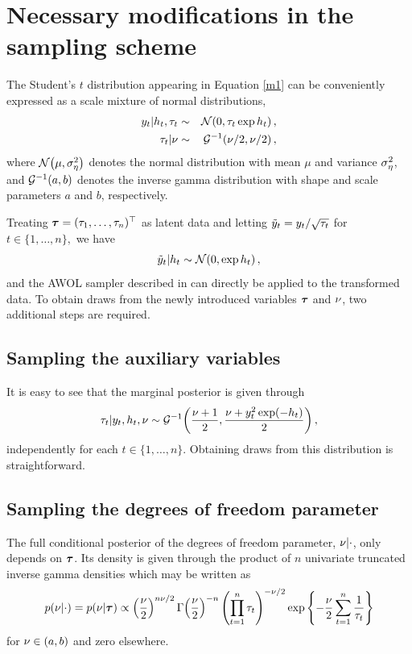 \documentclass[article, nojss]{jss}
\begin{document}
\section{Necessary modifications in the sampling scheme}
\label{sec:alg}

The Student's $t$ distribution appearing in Equation \ref{m1} can be conveniently expressed as a scale mixture of normal distributions,
\begin{eqnarray*}
y_{t}|\hsv_t,\taug_t &\sim&  \Normal{0, \taug_t \exp{\hsv_{t}}},%
 \\
 \taug_t|\df &\sim& \Gammainv{\df/2, \df/2},
\end{eqnarray*}
where $\mathcal{N}\!\left(\mu, {\sigma_\eta^2}\right)$ denotes the normal distribution with mean $\mu$ and variance ${\sigma_\eta^2}$, and $\mathcal{G}^{-1}\!\left(a,b\right)$ denotes the inverse gamma distribution with shape and scale parameters $a$ and $b$, respectively.

Treating $\bm{\tau} = (\tau_1, \dots, \tau_n)^\top$ as latent data and letting $\tilde y_t = y_t/\sqrt{\tau_t}$ for $t \in \{1,\dots,n\},$ we have
\[
\tilde y_t|h_t \sim \mathcal{N}\!\left(0, \exp{h_t}\right),
\]
and the AWOL sampler described in \cite{kas-fru:anc} can directly be applied to the transformed data. To obtain draws from the newly introduced variables $\bm{\tau}$ and $\nu$, two additional steps are required.

\subsection{Sampling the auxiliary variables}

It is easy to see that the marginal posterior is given through
\[
\tau_t|y_t,h_t,\nu \sim \mathcal{G}^{-1}\!\left(\frac{\nu + 1}{2},\frac{\nu + y_t^2\exp(-h_t)}{2}\right),
\]
independently for each $t \in \{1, \dots, n\}$. Obtaining draws from this distribution is straightforward.

\subsection{Sampling the degrees of freedom parameter}

The full conditional posterior of the degrees of freedom parameter, $\nu|\cdot$, only depends on $\bm{\tau}$. Its density is given through the product of $n$ univariate truncated inverse gamma densities which may be written as
\begin{eqnarray}
 \label{dfdens}
p(\nu|\cdot) = p(\nu|\bm{\tau}) \propto
\left(\frac{\nu}{2}\right)^{n\nu/2}
\Gamma\!\left(\frac{\nu}{2}\right)^{-n}
\left(\prod_{t=1}^n \tau_t\right)^{-\nu/2}
\exp\left\{-\frac{\nu}{2}\sum_{t=1}^n\frac{1}{\tau_t}\right\}
\end{eqnarray}
for $\nu \in (a,b)$ and zero elsewhere.
\end{document}
